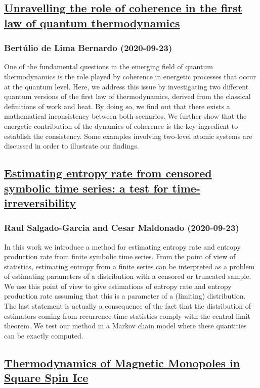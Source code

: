 \subsection*{\href{http://arxiv.org/abs/2009.11370v1}{Unravelling the role of coherence in the first law of quantum  thermodynamics}}
\subsubsection*{Bertúlio de Lima Bernardo (2020-09-23)}
One of the fundamental questions in the emerging field of quantum
thermodynamics is the role played by coherence in energetic processes that
occur at the quantum level. Here, we address this issue by investigating two
different quantum versions of the first law of thermodynamics, derived from the
classical definitions of work and heat. By doing so, we find out that there
exists a mathematical inconsistency between both scenarios. We further show
that the energetic contribution of the dynamics of coherence is the key
ingredient to establish the consistency. Some examples involving two-level
atomic systems are discussed in order to illustrate our findings.

\subsection*{\href{http://arxiv.org/abs/2009.11351v1}{Estimating entropy rate from censored symbolic time series: a test for  time-irreversibility}}
\subsubsection*{Raul Salgado-Garcia and Cesar Maldonado (2020-09-23)}
In this work we introduce a method for estimating entropy rate and entropy
production rate from finite symbolic time series. From the point of view of
statistics, estimating entropy from a finite series can be interpreted as a
problem of estimating parameters of a distribution with a censored or truncated
sample. We use this point of view to give estimations of entropy rate and
entropy production rate assuming that this is a parameter of a (limiting)
distribution. The last statement is actually a consequence of the fact that the
distribution of estimators coming from recurrence-time statistics comply with
the central limit theorem. We test our method in a Markov chain model where
these quantities can be exactly computed.

\subsection*{\href{http://arxiv.org/abs/2009.11331v1}{Thermodynamics of Magnetic Monopoles in Square Spin Ice}}
